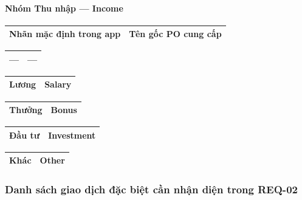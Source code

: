 \paragraph{Nhóm Thu nhập — Income}

\begin{table}[htbp]
\centering
\begin{tabularx}{\textwidth}{|l|X|}
\hline
Nhãn mặc định trong app & Tên gốc PO cung cấp \\ \hline
\end{tabularx}
\end{table}

\begin{table}[htbp]
\centering
\begin{tabularx}{\textwidth}{|l|X|}
\hline
--- & --- \\ \hline
\end{tabularx}
\end{table}

\begin{table}[htbp]
\centering
\begin{tabularx}{\textwidth}{|l|X|}
\hline
Lương & Salary \\ \hline
\end{tabularx}
\end{table}

\begin{table}[htbp]
\centering
\begin{tabularx}{\textwidth}{|l|X|}
\hline
Thưởng & Bonus \\ \hline
\end{tabularx}
\end{table}

\begin{table}[htbp]
\centering
\begin{tabularx}{\textwidth}{|l|X|}
\hline
Đầu tư & Investment \\ \hline
\end{tabularx}
\end{table}

\begin{table}[htbp]
\centering
\begin{tabularx}{\textwidth}{|l|X|}
\hline
Khác & Other \\ \hline
\end{tabularx}
\end{table}



\subsubsection{Danh sách giao dịch đặc biệt cần nhận diện trong REQ-02}

